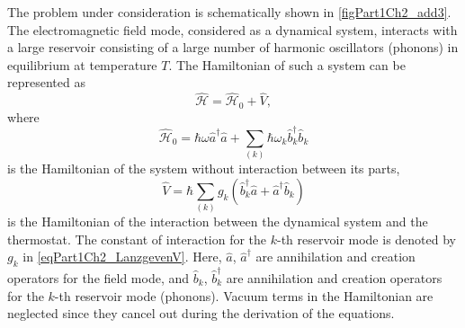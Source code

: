 The problem under consideration is schematically shown in \autoref{figPart1Ch2_add3}. The electromagnetic field mode, considered as a dynamical system, interacts with a large reservoir consisting of a large number of harmonic oscillators (phonons) in equilibrium at temperature $T$. The Hamiltonian of such a system can be represented as
\begin{equation}
\hat{\mathcal{H}} = \hat{\mathcal{H}}_0 + \hat{V},
\nonumber
\end{equation}
where
\begin{equation}
 \hat{\mathcal{H}}_0 = \hbar\omega \hat{a}^{\dag}\hat{a} +
\sum_{(k)} \hbar\omega_k \hat{b}_k^{\dag} \hat{b}_k
\nonumber
\end{equation}
is the Hamiltonian of the system without interaction between its parts,
\begin{equation}
 \hat{V} = \hbar \sum_{(k)}g_k\left(
\hat{b}_k^{\dag}\hat{a} + \hat{a}^{\dag}\hat{b}_k
\right)
\label{eqPart1Ch2_LanzgevenV}
\end{equation}
is the Hamiltonian of the interaction between the dynamical system and the thermostat. The constant of interaction for the $k$-th reservoir mode is denoted by $g_k$ in \eqref{eqPart1Ch2_LanzgevenV}. Here, $\hat{a}$, $\hat{a}^{\dag}$ are annihilation and creation operators for the field mode, and $\hat{b}_k$, $\hat{b}_{k}^{\dag}$ are annihilation and creation operators for the $k$-th reservoir mode (phonons). Vacuum terms in the Hamiltonian are neglected since they cancel out during the derivation of the equations.

